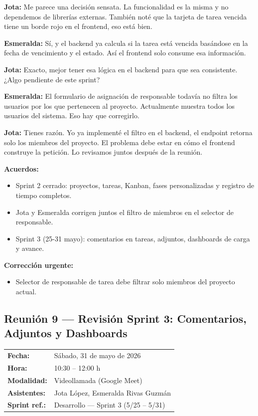 \documentclass[12pt, a4paper]{article}
\makeatletter
\newcommand{\actaheader}[5]{%
  \begin{mdframed}[
    backgroundcolor=sectionbg,
    linecolor=bordercolor,
    linewidth=1pt,
    innerleftmargin=12pt, innerrightmargin=12pt,
    innertopmargin=10pt, innerbottommargin=10pt,
    skipabove=8pt, skipbelow=8pt
  ]
  \begin{tabularx}{\linewidth}{@{}lX@{}}
    \textbf{Fecha:}       & #1 \\[2pt]
    \textbf{Hora:}        & #2 \\[2pt]
    \textbf{Modalidad:}   & #3 \\[2pt]
    \textbf{Asistentes:}  & #4 \\[2pt]
    \textbf{Sprint ref.:} & #5 \\
  \end{tabularx}
  \end{mdframed}%
}
\newcommand{\jota}[1]{\noindent\textbf{\color{primary}Jota:} #1\par\smallskip}
\newcommand{\esme}[1]{\noindent\textbf{\color{accentgreen}Esmeralda:} #1\par\smallskip}
\makeatother
\begin{document}
\jota{Me parece una decisión sensata. La funcionalidad es la misma y no dependemos de librerías externas. También noté que la tarjeta de tarea vencida tiene un borde rojo en el frontend, eso está bien.}

\esme{Sí, y el backend ya calcula si la tarea está vencida basándose en la fecha de vencimiento y el estado. Así el frontend solo consume esa información.}

\jota{Exacto, mejor tener esa lógica en el backend para que sea consistente. ¿Algo pendiente de este sprint?}

\esme{El formulario de asignación de responsable todavía no filtra los usuarios por los que pertenecen al proyecto. Actualmente muestra todos los usuarios del sistema. Eso hay que corregirlo.}

\jota{Tienes razón. Yo ya implementé el filtro en el backend, el endpoint retorna solo los miembros del proyecto. El problema debe estar en cómo el frontend construye la petición. Lo revisamos juntos después de la reunión.}

\begin{acuerdobox}
\textbf{Acuerdos:}
\begin{itemize}[leftmargin=1.2em, topsep=2pt]
  \item Sprint 2 cerrado: proyectos, tareas, Kanban, fases personalizadas y registro de tiempo completos.
  \item Jota y Esmeralda corrigen juntos el filtro de miembros en el selector de responsable.
  \item Sprint 3 (25-31 mayo): comentarios en tareas, adjuntos, dashboards de carga y avance.
\end{itemize}
\end{acuerdobox}

\begin{pendientebox}
\textbf{Corrección urgente:}
\begin{itemize}[leftmargin=1.2em, topsep=2pt]
  \item Selector de responsable de tarea debe filtrar solo miembros del proyecto actual.
\end{itemize}
\end{pendientebox}

\subsection{Reunión 9 — Revisión Sprint 3: Comentarios, Adjuntos y Dashboards}
\actaheader
  {Sábado, 31 de mayo de 2026}
  {10:30 -- 12:00 h}
  {Videollamada (Google Meet)}
  {Jota López, Esmeralda Rivas Guzmán}
  {Desarrollo — Sprint 3 (5/25 -- 5/31)}
\end{document}
